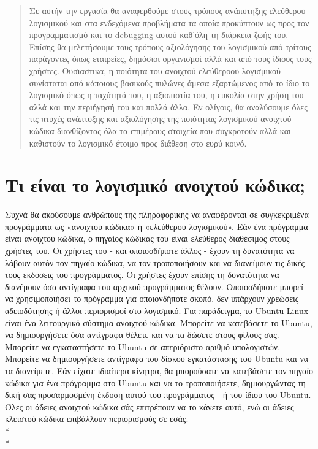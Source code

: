 \documentclass[a4paper, 11pt]{article}
\begin{document}
{\selectfont
\begin{abstract}
Σε αυτήν την εργασία θα αναφερθούμε στους τρόπους ανάπυτηξης ελεύθερου λογισμικού
και στα ενδεχόμενα προβλήματα τα οποία προκύπτουν ως προς τον προγραμματισμό και το 
\textlatin{debugging} αυτού καθ'όλη τη διάρκεια ζωής του. Επίσης θα μελετήσουμε τους 
τρόπους αξιολόγησης του λογισμικού από τρίτους παράγοντες όπως εταιρείες, δημόσιοι οργανισμοί 
αλλά και από τους ίδιους τους χρήστες. Ουσιαστικα, η ποιότητα του ανοιχτού-ελεύθεροου λογισμικού 
συνίσταται από κάποιους βασικούς πυλώνες άμεσα εξαρτώμενος από το ίδιο το λογισμικό όπως η ταχύτητά
του, η αξιοπιστία του, η ευκολία στην χρήση του αλλά και την περιήγησή του και πολλά άλλα. Εν ολίγοις, 
θα αναλύσουμε όλες τις πτυχές ανάπτυξης και αξιολόγησης της ποιότητας λογισμικού ανοιχτού κώδικα 
διανθίζοντας όλα τα επιμέρους στοιχεία που συγκροτούν αλλά και καθιστούν το λογισμικό έτοιμο προς διάθεση 
στο ευρύ κοινό.
\end{abstract}

{\selectfont\section{Τι είναι το λογισμικό ανοιχτού κώδικα\textlatin{;}}}
 Συχνά θα ακούσουμε ανθρώπους της πληροφορικής να αναφέρονται σε συγκεκριμένα προγράμματα ως «ανοιχτού κώδικα» ή «ελεύθερου λογισμικού». Εάν ένα πρόγραμμα είναι ανοιχτού κώδικα, ο πηγαίος κώδικας του είναι ελεύθερος διαθέσιμος στους χρήστες του. Οι χρήστες του - και οποιοσδήποτε άλλος - έχουν τη δυνατότητα να λάβουν αυτόν τον πηγαίο κώδικα, να τον τροποποιήσουν και να διανείμουν τις δικές τους εκδόσεις του προγράμματος. Οι χρήστες έχουν επίσης τη δυνατότητα να διανέμουν όσα αντίγραφα του αρχικού προγράμματος θέλουν. Οποιοσδήποτε μπορεί να χρησιμοποιήσει το πρόγραμμα για οποιονδήποτε σκοπό. δεν υπάρχουν χρεώσεις αδειοδότησης ή άλλοι περιορισμοί στο λογισμικό. Για παράδειγμα, το \textlatin{Ubuntu Linux} είναι ένα λειτουργικό σύστημα ανοιχτού κώδικα. Μπορείτε να κατεβάσετε το \textlatin{Ubuntu}, να δημιουργήσετε όσα αντίγραφα θέλετε και να τα δώσετε στους φίλους σας. Μπορείτε να εγκαταστήσετε το Ubuntu σε απεριόριστο αριθμό υπολογιστών. Μπορείτε να δημιουργήσετε αντίγραφα του δίσκου εγκατάστασης του \textlatin{Ubuntu} και να τα διανείμετε. Εάν είχατε ιδιαίτερα κίνητρα, θα μπορούσατε να κατεβάσετε τον πηγαίο κώδικα για ένα πρόγραμμα στο Ubuntu και να το τροποποιήσετε, δημιουργώντας τη δική σας προσαρμοσμένη έκδοση αυτού του προγράμματος - ή του ίδιου του \textlatin{Ubuntu}. Όλες οι άδειες ανοιχτού κώδικα σάς επιτρέπουν να το κάνετε αυτό, ενώ οι άδειες κλειστού κώδικα επιβάλλουν περιορισμούς σε εσάς.\\*
\\*
}
\end{document}
